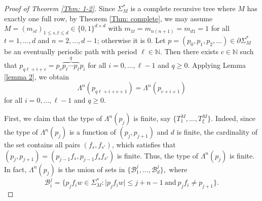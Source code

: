 \documentclass{amsart}
\theoremstyle{definition}
\begin{document}
\begin{proof}[Proof of Theorem \ref{Thm: 1-2}] Since $\Sigma_M^*$ is a complete recursive tree where $M$ has exactly one full row, by Theorem \ref{Thm: complete}, we may assume $M=(m_{st})_{1\leq s,t\leq d}\in \{0,1\}^{d\times d}$ with $m_{1t}=m_{n(n+1)}=m_{d1}=1$ for all $t=1,...,d$ and $n=2,...,d-1$; otherwise it is $0.$ Let $p=(p_0,p_1,p_2,...)\in\partial\Sigma_M^*$ be an eventually periodic path with period $\ell\in\mathbb{N}.$ Then there exists $c\in\mathbb{N}$ such that $p_{q\ell+i+c}=p_c\overbrace{p_\ell\cdots p_\ell}^{q}p_i$ for all $i=0,...,\ell-1$ and $q\geq 0.$ Applying Lemma \ref{lemma 2}, we obtain 
\begin{equation}\label{ep1}
\Lambda^n(p_{q\ell+i+c+1})=\Lambda^n(p_{c+i+1})
\end{equation}
for all $i=0,...,\ell-1$ and $q\geq 0.$ 

First, we claim that the type of $\Lambda^n(p_j)$ is finite, say $\{T_1^M,...,T_\xi^M\}.$ Indeed, since the type of $\Lambda^n(p_j)$ is a function of $(p_j,p_{j+1})$ and $d$ is finite, the cardinality of the set contains all pairs $(f_s,f_{s'})$, which satisfies that $(p_j,p_{j+1})=(p_{j-1}f_s,p_{j-1}f_sf_{s'})$ is finite. Thus, the type of $\Lambda^n(p_j)$ is finite. In fact, $\Lambda^n(p_j)$ is the union of sets in $\{\mathcal{B}_1^j,...,\mathcal{B}_d^j\},$ where \[\mathcal{B}_i^j=\{p_jf_iw\in\Sigma_M^*:\lvert p_jf_iw\rvert\leq j+n-1~\text{and}~p_jf_i\neq p_{j+1}\}.\] 


\end{proof}
\end{document}
